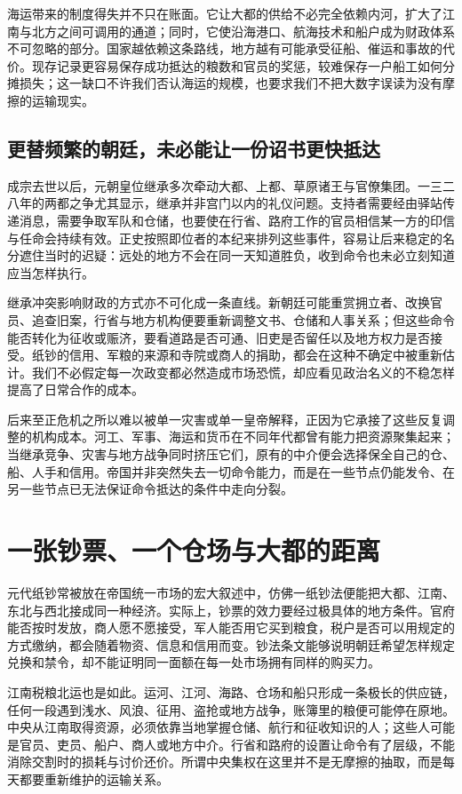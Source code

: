 海运带来的制度得失并不只在账面。它让大都的供给不必完全依赖内河，扩大了江南与北方之间可调用的通道；同时，它使沿海港口、航海技术和船户成为财政体系不可忽略的部分。国家越依赖这条路线，地方越有可能承受征船、催运和事故的代价。现存记录更容易保存成功抵达的粮数和官员的奖惩，较难保存一户船工如何分摊损失；这一缺口不许我们否认海运的规模，也要求我们不把大数字误读为没有摩擦的运输现实。

\subsection{更替频繁的朝廷，未必能让一份诏书更快抵达}

成宗去世以后，元朝皇位继承多次牵动大都、上都、草原诸王与官僚集团。一三二八年的两都之争尤其显示，继承并非宫门以内的礼仪问题。支持者需要经由驿站传递消息，需要争取军队和仓储，也要使在行省、路府工作的官员相信某一方的印信与任命会持续有效。正史按照即位者的本纪来排列这些事件，容易让后来稳定的名分遮住当时的迟疑：远处的地方不会在同一天知道胜负，收到命令也未必立刻知道应当怎样执行。

继承冲突影响财政的方式亦不可化成一条直线。新朝廷可能重赏拥立者、改换官员、追查旧案，行省与地方机构便要重新调整文书、仓储和人事关系；但这些命令能否转化为征收或赈济，要看道路是否可通、旧吏是否留任以及地方权力是否接受。纸钞的信用、军粮的来源和寺院或商人的捐助，都会在这种不确定中被重新估计。我们不必假定每一次政变都必然造成市场恐慌，却应看见政治名义的不稳怎样提高了日常合作的成本。

后来至正危机之所以难以被单一灾害或单一皇帝解释，正因为它承接了这些反复调整的机构成本。河工、军事、海运和货币在不同年代都曾有能力把资源聚集起来；当继承竞争、灾害与地方战争同时挤压它们，原有的中介便会选择保全自己的仓、船、人手和信用。帝国并非突然失去一切命令能力，而是在一些节点仍能发令、在另一些节点已无法保证命令抵达的条件中走向分裂。

\section{一张钞票、一个仓场与大都的距离}

元代纸钞常被放在帝国统一市场的宏大叙述中，仿佛一纸钞法便能把大都、江南、东北与西北接成同一种经济。实际上，钞票的效力要经过极具体的地方条件。官府能否按时发放，商人愿不愿接受，军人能否用它买到粮食，税户是否可以用规定的方式缴纳，都会随着物资、信息和信用而变。钞法条文能够说明朝廷希望怎样规定兑换和禁令，却不能证明同一面额在每一处市场拥有同样的购买力。

江南税粮北运也是如此。运河、江河、海路、仓场和船只形成一条极长的供应链，任何一段遇到浅水、风浪、征用、盗抢或地方战争，账簿里的粮便可能停在原地。中央从江南取得资源，必须依靠当地掌握仓储、航行和征收知识的人；这些人可能是官员、吏员、船户、商人或地方中介。行省和路府的设置让命令有了层级，不能消除交割时的损耗与讨价还价。所谓中央集权在这里并不是无摩擦的抽取，而是每天都要重新维护的运输关系。

